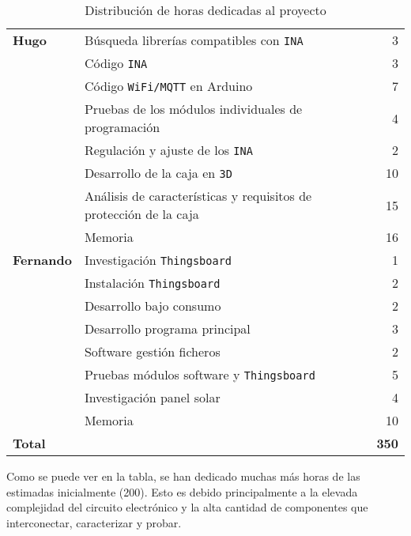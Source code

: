 \begin{table}[H]
\begin{tabular}[c]{llr}
        \textbf{Hugo}       & Búsqueda librerías compatibles con \texttt{INA}                   & 3   \\
                            & Código \texttt{INA}                                               & 3   \\
                            & Código \texttt{WiFi/MQTT} en Arduino                              & 7   \\
                            & Pruebas de los módulos individuales de programación               & 4   \\
                            & Regulación y ajuste de los \texttt{INA}                           & 2   \\
                            & Desarrollo de la caja en \texttt{3D}                              & 10  \\
                            & Análisis de características y requisitos de protección de la caja & 15  \\
                            & Memoria                                                           & 16  \\ \midrule

        \textbf{Fernando}   & Investigación \texttt{Thingsboard}                                & 1   \\
                            & Instalación \texttt{Thingsboard}                                  & 2   \\
                            & Desarrollo bajo consumo                                           & 2   \\
                            & Desarrollo programa principal                                     & 3   \\
                            & Software gestión ficheros                                         & 2   \\
                            & Pruebas módulos software y \texttt{Thingsboard}                   & 5   \\
                            & Investigación panel solar                                         & 4   \\
                            & Memoria                                                           & 10  \\ \midrule

        \textbf{Total}      &                                                                   & \textbf{350} \\ \bottomrule

    \end{tabular}
\caption{Distribución de horas dedicadas al proyecto}
\label{tab:horas}
\end{table}

Como se puede ver en la tabla, se han dedicado muchas más horas de las estimadas inicialmente (200). Esto es debido principalmente a la elevada complejidad del circuito electrónico y la alta cantidad de componentes que interconectar, caracterizar y probar.
